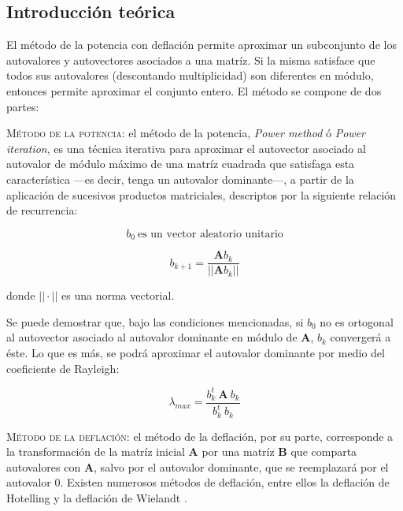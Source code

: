 
\vspace{1em}
\subsection{Introducción teórica} El método de la potencia con deflación permite aproximar un subconjunto de los autovalores y autovectores asociados a una matríz. Si la misma satisface que todos sus autovalores (descontando multiplicidad) son diferentes en módulo, entonces permite aproximar el conjunto entero. El método se compone de dos partes:


\vspace{2em}
\noindent \textsc{Método de la potencia}: el método de la potencia, \textit{Power method} ó \textit{Power iteration}, es una técnica iterativa para aproximar el autovector asociado al autovalor de módulo máximo de una matríz cuadrada que satisfaga esta característica ---es decir, tenga un autovalor dominante---, a partir de la aplicación de sucesivos productos matriciales, descriptos por la siguiente relación de recurrencia:

\begin{equation*}
    b_0\ \text{es un vector aleatorio unitario}
\end{equation*}

\begin{equation} \label{eqpotencia}
    b_{k+1} = \frac{\mathbf{A}b_k}{||\mathbf{A}b_k||}
\end{equation}

\vspace{1em}
\noindent donde $|| \cdot ||$ es una norma vectorial.

\vspace{1em}
Se puede demostrar  que, bajo las condiciones mencionadas, si $b_0$ no es ortogonal al autovector asociado al autovalor dominante en módulo de \textbf{A}, $b_k$ convergerá a éste. Lo que es más, se podrá aproximar el autovalor dominante por medio del coeficiente de Rayleigh:

\vspace{1em}
\begin{equation}
    \lambda_{max} = \frac{b_k^t\ \mathbf{A}\ b_k}{b_k^t\ b_k}
\end{equation}


\vspace{2em}
\noindent \textsc{Método de la deflación}: el método de la deflación, por su parte, corresponde a la transformación de la matríz inicial \textbf{A} por una matríz \textbf{B} que comparta autovalores con \textbf{A}, salvo por el autovalor dominante, que se reemplazará por el autovalor 0. Existen numerosos métodos de deflación, entre ellos la deflación de Hotelling  y la deflación de Wielandt .   




